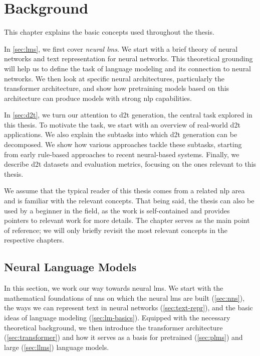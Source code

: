 
\chapter{Background}
\label{chap:background}

This chapter explains the basic concepts used throughout the thesis.

In \autoref{sec:lms}, we first cover \emph{neural \acp{lm}}. We start with a brief theory of neural networks and text representation for neural networks. This theoretical grounding will help us to define the task of language modeling and its connection to neural networks. We then look at specific neural architectures, particularly the transformer architecture, and show how pretraining models based on this architecture can produce models with strong \ac{nlp} capabilities.

In \autoref{sec:d2t}, we turn our attention to \ac{d2t} generation, the central task explored in this thesis. To motivate the task, we start with an overview of real-world \ac{d2t} applications. We also explain the subtasks into which \ac{d2t} generation can be decomposed. We show how various approaches tackle these subtasks, starting from early rule-based approaches to recent neural-based systems. Finally, we describe \ac{d2t} datasets and evaluation metrics, focusing on the ones relevant to this thesis.

We assume that the typical reader of this thesis comes from a related \ac{nlp} area and is familiar with the relevant concepts. That being said, the thesis can also be used by a beginner in the field, as the work is self-contained and provides pointers to relevant work for more details. The chapter serves as the main point of reference; we will only briefly revisit the most relevant concepts in the respective chapters.




\section{Neural Language Models}
\label{sec:lms}
In this section, we work our way towards neural \acp{lm}. We start with the mathematical foundations of \acp{nn} on which the neural \acp{lm} are built (\autoref{sec:nns}), the ways we can represent text in neural networks (\autoref{sec:text-repr}), and the basic ideas of language modeling (\autoref{sec:lm-basics}). Equipped with the necessary theoretical background, we then introduce the transformer architecture (\autoref{sec:transformer}) and how it serves as a basis for pretrained (\autoref{sec:plms}) and large (\autoref{sec:llms}) language models.

